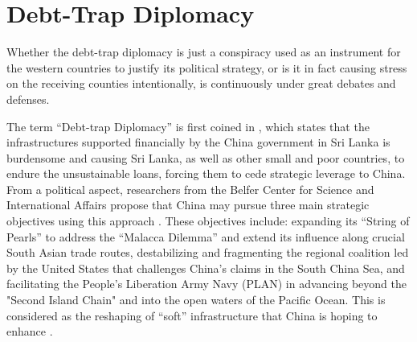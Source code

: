 \section*{Debt-Trap Diplomacy}
Whether the debt-trap diplomacy is just a conspiracy used as an instrument for the western countries to justify its political strategy, or is it in fact causing stress on the receiving counties intentionally, is continuously under great debates and defenses.

The term ``Debt-trap Diplomacy'' is first coined in \citet{Chellaney_2017}, which states that the infrastructures supported financially by the China government in Sri Lanka is burdensome and causing Sri Lanka, as well as other small and poor countries, to endure the unsustainable loans, forcing them to cede strategic leverage to China.
From a political aspect,
researchers from the Belfer Center for Science and International Affairs propose that China may pursue three main strategic objectives using this approach \citep*{Parker2018}.
These objectives include: expanding its ``String of Pearls'' to address the ``Malacca Dilemma\footnotemark{}'' and extend its influence along crucial South Asian trade routes, destabilizing and fragmenting the regional coalition led by the United States that challenges China's claims in the South China Sea, and facilitating the People's Liberation Army Navy (PLAN) in advancing beyond the "Second Island Chain" and into the open waters of the Pacific Ocean.
This is considered as the reshaping of ``soft'' infrastructure that China is hoping to enhance \citep{Jonathan-Hillman-18}.

